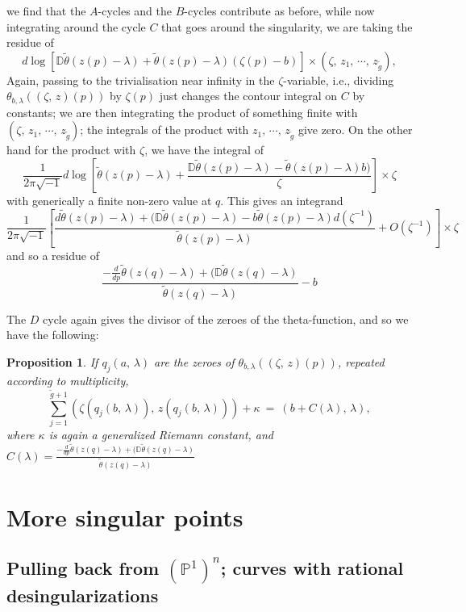 \documentclass[12pt,reqno]{amsart}
\numberwithin{equation}{section}
\newtheorem{proposition}[theorem]{Proposition}
\theoremstyle{definition}
\theoremstyle{remark}
\def\bP{{\mathbb {P}}}
\def\bD{{\mathbb {D}}}
\def\bD{{\mathbb {D}}}
\begin{document}
we find that the $A$-cycles and the $B$-cycles contribute as before, while now integrating around the cycle
$C$ that goes around the singularity, we are taking the residue of 
$$d\log[ \bD\widetilde{\theta}(z(p)-\lambda) +  \widetilde{\theta}( z(p)-\lambda)(\zeta(p)-b)]\times
(\zeta,\, z_1,\, \cdots ,\, z_{\widetilde g}),$$
Again, passing to the trivialisation near infinity in the $\zeta$-variable, i.e., dividing $\theta_{b,\lambda}((\zeta,\, z)(p))$ by $\zeta(p)$ just changes the contour integral on $C$ by constants; we are then integrating the product of something finite with $(\zeta,\, z_1,\, \cdots ,\, z_{\widetilde g})$; the integrals of the product with $ z_1,\, \cdots ,\, z_{\widetilde g}$ give zero. On the other hand for the  product with $\zeta$, we have the integral of 
$$\frac{1}{2\pi\sqrt{-1}}  d\log[  \widetilde{\theta}( z(p)-\lambda) + \frac{ \bD\widetilde{\theta}(z(p)-\lambda) -  \widetilde{\theta}( z(p)-\lambda)b)}{\zeta}]\times \zeta  $$
with generically a finite non-zero value at $q$. This gives an integrand
$$\frac{1}{2\pi\sqrt{-1}}  [\frac { d\widetilde{\theta}( z(p)-\lambda)  +  ( \bD\widetilde{\theta}(z(p)-\lambda) - b\widetilde{\theta}( z(p)-\lambda) d(\zeta^{-1}) } {\widetilde{\theta}( z(p)-\lambda)}+ O(\zeta^{-1}) ]\times \zeta$$
and so a residue of 
$$ \frac { -\frac{d}{dp}\widetilde{\theta}( z(q)-\lambda)  +  ( \bD\widetilde{\theta}(z(q)-\lambda) } {\widetilde{\theta}( z(q)-\lambda)} - b$$ 

   The $D$ cycle again gives the divisor of the zeroes of the
theta-function, and so we have the following:

\begin{proposition}
If $q_j(a,\, \lambda)$ are the zeroes of $\theta_{b,\lambda}((\zeta, \,z)(p))$, repeated according to multiplicity,
$$\sum_{j=1}^{\widetilde g +1} (\zeta(q_j(b, \,\lambda)),\, z(q_j(b,\, \lambda)))+ \kappa\
=\ (b + C(\lambda),\, \lambda),$$
where $\kappa $ is again a generalized Riemann constant, and 
$C(\lambda) =  \frac { -\frac{d}{dp}\widetilde{\theta}( z(q)-\lambda)  +  ( \bD\widetilde{\theta}(z(q)-\lambda) } {\widetilde{\theta}( z(q)-\lambda)} $
\end{proposition}

\section{More singular points} 

\subsection{Pulling back from $(\bP^1)^n$; curves with rational desingularizations}
\end{document}
